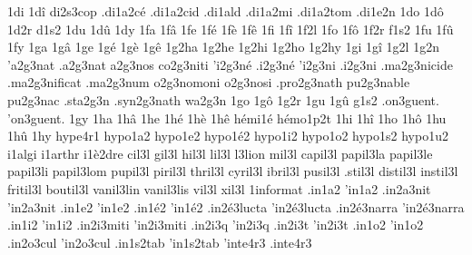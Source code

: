 {1di
1d\^i
                    di2s3cop
                    .di1a2c\'e
                    .di1a2cid
                    .di1ald
                    .di1a2mi
                    .di1a2tom
                    .di1e2n
1do
1d\^o
1d2r
d1s2
1du
1d\^u
1dy
1fa
1f\^a
1fe
1f\'e
1f\`e
1f\^e
1fi
1f\^i
1f2l
1fo
1f\^o
1f2r
f1s2
1fu
1f\^u
1fy
1ga
1g\^a
1ge
1g\'e
1g\`e
1g\^e
1g2ha
1g2he
1g2hi
1g2ho
1g2hy
1gi
1g\^i
1g2l
    1g2n
  'a2g3nat     %
  .a2g3nat     %
   a2g3nos     %
  co2g3niti    %
  'i2g3n\'e    %
  .i2g3n\'e    %
  'i2g3ni      %
  .i2g3ni      %
 .ma2g3nicide  %
 .ma2g3nificat %
 .ma2g3num     %
   o2g3nomoni  %
   o2g3nosi    %
.pro2g3nath    %
  pu2g3nable   %
  pu2g3nac     %
.sta2g3n
.syn2g3nath    %
  wa2g3n
1go
1g\^o
1g2r
1gu
1g\^u
g1s2
.on3guent.
'on3guent.
1gy
1ha
1h\^a
1he
1h\'e
1h\`e
1h\^e
                    h\'emi1\'e
                    h\'emo1p2t
1hi
1h\^i
1ho
1h\^o
1hu
1h\^u
1hy
                    hype4r1
                    hypo1a2
                    hypo1e2 %
                    hypo1\'e2
                    hypo1i2
                    hypo1o2
                    hypo1s2
                    hypo1u2
                    i1algi
                    i1arthr
                    i1\`e2dre
   cil3l
   gil3l
   hil3l
   lil3l
     l3lion
   mil3l
 capil3l
 papil3la
 papil3le
 papil3li
 papil3lom
 pupil3l
 piril3l
 thril3l
 cyril3l
 ibril3l
 pusil3l
 .stil3l
distil3l
instil3l
fritil3l
boutil3l
 vanil3lin
 vanil3lis
   vil3l
   xil3l
                    1informat %
                    .in1a2
                    'in1a2
                    .in2a3nit
                    'in2a3nit
                    .in1e2
                    'in1e2
                    .in1\'e2
                    'in1\'e2
                    .in2\'e3lucta
                    'in2\'e3lucta
                    .in2\'e3narra
                    'in2\'e3narra
                    .in1i2
                    'in1i2
                    .in2i3miti
                    'in2i3miti
                    .in2i3q
                    'in2i3q
                    .in2i3t
                    'in2i3t
                    .in1o2
                    'in1o2
                    .in2o3cul
                    'in2o3cul
                    .in1s2tab
                    'in1s2tab
                    'inte4r3
                    .inte4r3
}
